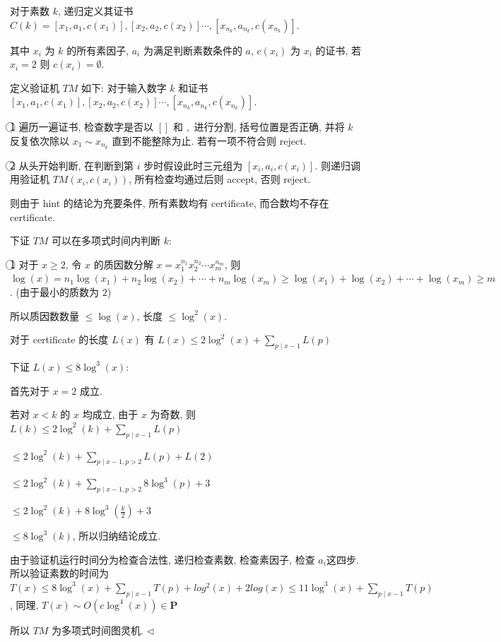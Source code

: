 \documentclass[11pt]{article}
\newcommand{\mP}{\mathbf{P}}
\newenvironment{answer}[1][Answer]{\begin{trivlist}
		\item[\hskip \labelsep {\bfseries #1.}\hskip \labelsep]}{\hfill$\lhd$\end{trivlist}}
\begin{document}
	\begin{answer}
		对于素数 $k$, 递归定义其证书 $C(k)=[x_1,a_1,c(x_1)],[x_2,a_2,c(x_2)]\cdots,[x_{n_k},a_{n_k},c(x_{n_k})]$.
		
		其中 $x_i$ 为 $k$ 的所有素因子, $a_i$ 为满足判断素数条件的 $a$, $c(x_i)$ 为 $x_i$ 的证书, 若 $x_i=2$ 则 $c(x_i)=\emptyset$.
		
		定义验证机 $TM$ 如下:
		对于输入数字 $k$ 和证书 $[x_1,a_1,c(x_1)],[x_2,a_2,c(x_2)]\cdots,[x_{n_k},a_{n_k},c(x_{n_k})]$.
		
		\textcircled{1} 遍历一遍证书, 检查数字是否以 $[]$ 和 $,$ 进行分割, 括号位置是否正确, 并将 $k$ 反复依次除以 $x_1\sim x_{n_k}$ 直到不能整除为止. 若有一项不符合则 reject.
		
		\textcircled{2} 从头开始判断, 在判断到第 $i$ 步时假设此时三元组为 $[x_i,a_i,c(x_i)]$. 则递归调用验证机 $TM(x_i,c(x_i))$, 所有检查均通过后则 accept, 否则 reject.
		
		则由于 hint 的结论为充要条件, 所有素数均有 certificate, 而合数均不存在 certificate.
		
		下证 $TM$ 可以在多项式时间内判断 $k$:
		
		\textcircled{1} 对于 $x\geq 2$, 令 $x$ 的质因数分解 $x=x_1^{n_1}x_2^{n_2}\cdots x_m^{n_m}$, 则 $\log(x)=n_1\log(x_1)+n_2\log(x_2)+\cdots+n_m\log(x_m)\geq \log(x_1)+\log(x_2)+\cdots+\log(x_m)\geq m$. (由于最小的质数为 $2$)
		
		所以质因数数量 $\leq\log(x)$, 长度 $\leq\log^2(x)$.
		
		对于 certificate 的长度 $L(x)$ 有 $L(x)\leq2\log^2(x)+\sum\limits_{p\mid x-1}L(p)$
		
		下证 $L(x)\leq8\log^3(x)$:
		
		首先对于 $x=2$ 成立.
		
		若对 $x<k$ 的 $x$ 均成立, 由于 $x$ 为奇数, 则 $L(k)\leq2\log^2(k)+\sum\limits_{p\mid x-1}L(p)$
		
		$\leq2\log^2(k)+\sum\limits_{p\mid x-1,p>2}L(p)+L(2)$
		
		$\leq2\log^2(k)+\sum\limits_{p\mid x-1,p>2}8\log^3(p)+3$
		
		$\leq2\log^2(k)+8\log^3(\frac{k}{2})+3$
		
		$\leq8\log^3(k)$, 所以归纳结论成立.
		
		由于验证机运行时间分为检查合法性, 递归检查素数, 检查素因子, 检查 $a_i$这四步. 所以验证素数的时间为 $T(x)\leq 8\log^3(x)+\sum\limits_{p\mid x-1}T(p)+log^2(x)+2log(x)\leq 11\log^3(x)+\sum\limits_{p\mid x-1}T(p)$, 同理, $T(x)\sim O(c\log^4(x))\in\mP$
		
		所以 $TM$ 为多项式时间图灵机.
	\end{answer}
\end{document}
